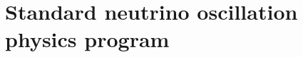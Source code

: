 \chapter{Standard neutrino oscillation physics program}
\label{ch:osc}














%









%

%

